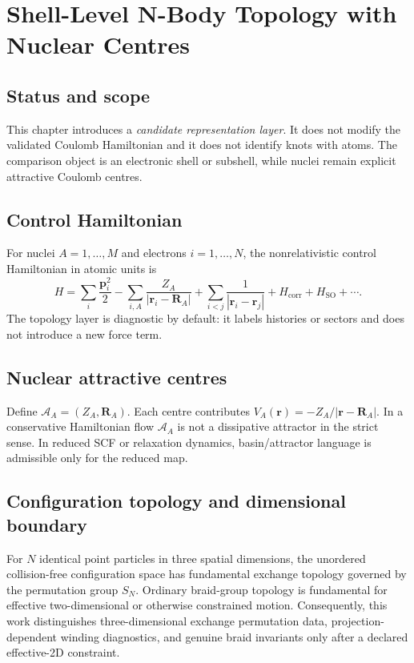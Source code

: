 \chapter{Shell-Level N-Body Topology with Nuclear Centres}
\label{ch:shell-nbody-topology}

\section{Status and scope}
This chapter introduces a \emph{candidate representation layer}. It does not modify the validated Coulomb Hamiltonian and it does not identify knots with atoms. The comparison object is an electronic shell or subshell, while nuclei remain explicit attractive Coulomb centres.

\section{Control Hamiltonian}
For nuclei $A=1,\ldots,M$ and electrons $i=1,\ldots,N$, the nonrelativistic control Hamiltonian in atomic units is
\begin{equation}
H=\sum_i\frac{\mathbf p_i^2}{2}-\sum_{i,A}\frac{Z_A}{|\mathbf r_i-\mathbf R_A|}+\sum_{i<j}\frac{1}{|\mathbf r_i-\mathbf r_j|}+H_{\mathrm{corr}}+H_{\mathrm{SO}}+\cdots.
\end{equation}
The topology layer is diagnostic by default: it labels histories or sectors and does not introduce a new force term.

\section{Nuclear attractive centres}
Define $\mathcal A_A=(Z_A,\mathbf R_A)$. Each centre contributes $V_A(\mathbf r)=-Z_A/|\mathbf r-\mathbf R_A|$. In a conservative Hamiltonian flow $\mathcal A_A$ is not a dissipative attractor in the strict sense. In reduced SCF or relaxation dynamics, basin/attractor language is admissible only for the reduced map.

\section{Configuration topology and dimensional boundary}
For $N$ identical point particles in three spatial dimensions, the unordered collision-free configuration space has fundamental exchange topology governed by the permutation group $S_N$. Ordinary braid-group topology is fundamental for effective two-dimensional or otherwise constrained motion. Consequently, this work distinguishes three-dimensional exchange permutation data, projection-dependent winding diagnostics, and genuine braid invariants only after a declared effective-2D constraint.

